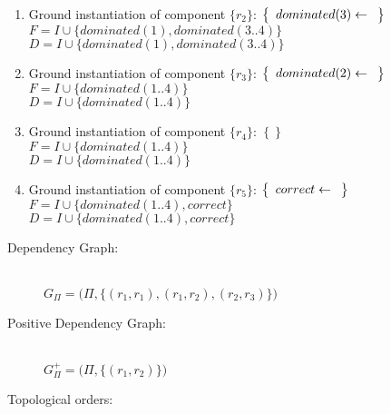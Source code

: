 \begin{Loesung}
\begin{UList}
\begin{description}
{\begin{enumerate}
  \)
  \\
  $F = I \cup \{dominated(1), dominated(4) \}$
  \\ 
  $D = I \cup \{dominated(1), dominated(4) \}$
  \item Ground instantiation of component $\{r_2\}$:
  \( \left\{
  \begin{array}{r@{}c@{}l}
    dominated(3) & {} \leftarrow {} & \\
  \end{array}
  \right\}
  \)
  \\
  $F = I \cup \{dominated(1), dominated(3..4) \}$
  \\ 
  $D = I \cup \{dominated(1), dominated(3..4) \}$
  \item Ground instantiation of component $\{r_3\}$:
  \( \left\{
  \begin{array}{r@{}c@{}l}
    dominated(2) & {} \leftarrow {} & \\
  \end{array}
  \right\}
  \)
  \\
  $F = I \cup \{dominated(1..4) \}$
  \\
  $D = I \cup \{dominated(1..4) \}$
  \item Ground instantiation of component $\{r_4\}$:
  \( \left\{
  \right\}
  \)
  \\
  $F = I \cup \{dominated(1..4) \}$
  \\
  $D = I \cup \{dominated(1..4) \}$
  \item Ground instantiation of component $\{r_5\}$:
  \( \left\{
  \begin{array}{r@{}c@{}l}
    correct & {} \leftarrow {} & \\
  \end{array}
  \right\}
  \)
  \\
  $F = I \cup \{dominated(1..4), correct \}$
  \\
  $D = I \cup \{dominated(1..4), correct \}$
\end{enumerate}
}
%
\end{description}
%
\item 
\begin{description}
%
\item[Dependency Graph:] ~\\
\(
  G_{\Pi} = \big( \Pi, \{(r_1,r_1), (r_1,r_2), (r_2,r_3)\} \big)
\)
%
\item[Positive Dependency Graph:] ~\\
\(
  G_{\Pi}^+ = \big( \Pi, \{(r_1,r_2)\} \big)
\)
%
\item[Topological orders:] ~\\

\end{description}
\end{UList}
\end{Loesung}
